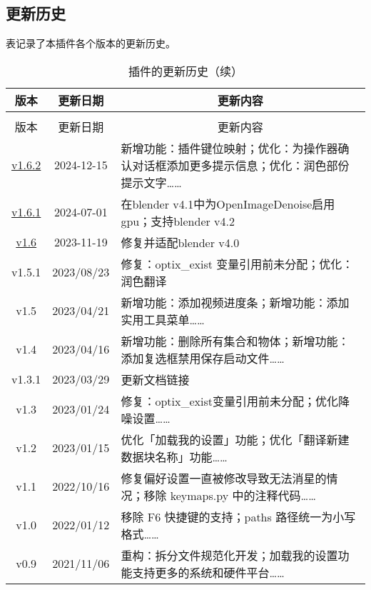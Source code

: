 \documentclass{../../public_resources/doc}
\begin{document}
\subsection{更新历史}
表记录了本插件各个版本的更新历史。
\begin{longtable}{|*{2}{c|}m{300pt}|}
    \caption{插件的更新历史}\label{更新历史} \\
    \hline
    版本 & 更新日期 & \multicolumn{1}{c|}{更新内容} \\
    \hline
    \endfirsthead

    \caption{插件的更新历史（续）} \\
    \hline
    版本 & 更新日期 & \multicolumn{1}{c|}{更新内容} \\
    \hline
    \endhead

    \href{https://github.com/Mister-Kin/ToggleLanguage/releases/tag/v1.6.2}{v1.6.2} & 2024-12-15 & 新增功能：插件键位映射；优化：为操作器确认对话框添加更多提示信息；优化：润色部份提示文字……\\
    \hline
    \href{https://github.com/Mister-Kin/ToggleLanguage/releases/tag/v1.6.1}{v1.6.1} & 2024-07-01 & 在blender v4.1中为OpenImageDenoise启用gpu；支持blender v4.2\\
    \hline
    \href{https://github.com/Mister-Kin/ToggleLanguage/releases/tag/v1.6}{v1.6} & 2023-11-19 & 修复并适配blender v4.0 \\
    \hline
    v1.5.1 & 2023/08/23 & 修复：optix\_exist 变量引用前未分配；优化：润色翻译 \\
    \hline
    v1.5 & 2023/04/21 & 新增功能：添加视频进度条；新增功能：添加实用工具菜单…… \\
    \hline
    v1.4 & 2023/04/16 & 新增功能：删除所有集合和物体；新增功能：添加复选框禁用保存启动文件……\\
    \hline
    v1.3.1 & 2023/03/29 & 更新文档链接 \\
    \hline
    v1.3 & 2023/01/24 & 修复：optix\_exist变量引用前未分配；优化降噪设置……\\
    \hline
    v1.2 & 2023/01/15 & 优化「加载我的设置」功能；优化「翻译新建数据块名称」功能…… \\
    \hline
    v1.1 & 2022/10/16 & 修复偏好设置一直被修改导致无法消星的情况；移除 keymaps.py 中的注释代码…… \\
    \hline
    v1.0 & 2022/01/12 & 移除 F6 快捷键的支持；paths 路径统一为小写格式…… \\
    \hline
    v0.9 & 2021/11/06 & 重构：拆分文件规范化开发；加载我的设置功能支持更多的系统和硬件平台……\\

\end{longtable}
\end{document}
